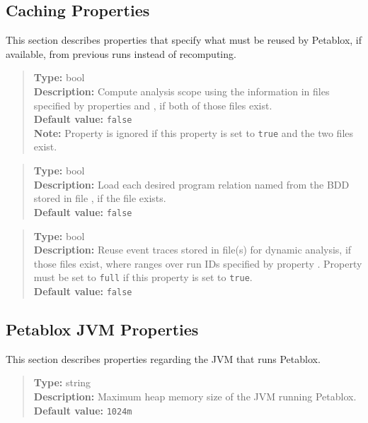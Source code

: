 \subsection{Caching Properties}
\label{sec:caching-props}

This section describes properties that specify what must be reused by Petablox, if available, from previous runs instead of recomputing.

\begin{quote}
{\bf Type:} bool \\
{\bf Description:} Compute analysis scope using the information in files specified by properties  and , if both of those files exist. \\
{\bf Default value:} {\tt false} \\
{\bf Note:} Property  is ignored if this property is set to {\tt true} and the two files exist. 
\end{quote}

\begin{quote}
{\bf Type:} bool  \\
{\bf Description:} Load each desired program relation named  from the BDD stored in file , if the file exists. \\
{\bf Default value:} {\tt false}
\end{quote}

\begin{quote}
{\bf Type:} bool \\
{\bf Description:} Reuse event traces stored in file(s) \code{petablox.trace.file]_full_ver0_runM.txt} for dynamic analysis, if those files exist,
where  ranges over run IDs specified by property .
Property  must be set to {\tt full} if this property is set to {\tt true}. \\
{\bf Default value:} {\tt false}
\end{quote}

\subsection{Petablox JVM Properties}
\label{sec:jvm-props}

This section describes properties regarding the JVM that runs Petablox.

\begin{quote}
{\bf Type:} string \\
{\bf Description:} Maximum heap memory size of the JVM running Petablox. \\
{\bf Default value:} {\tt 1024m}
\end{quote}

